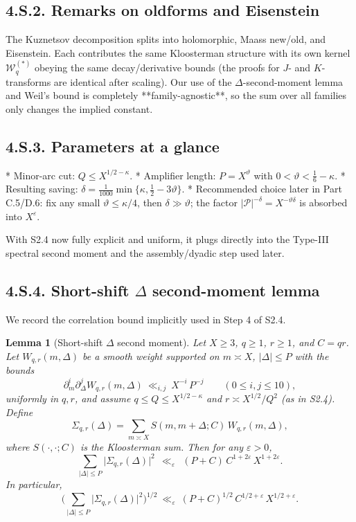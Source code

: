 \documentclass[11pt]{article}
\newtheorem{lemma}{Lemma}[section]
\theoremstyle{definition}
\theoremstyle{remark}
\begin{document}
\subsection*{4.S.2. Remarks on oldforms and Eisenstein}

The Kuznetsov decomposition splits into holomorphic, Maass new/old, and Eisenstein. Each contributes the same Kloosterman structure with its own kernel $\mathcal W_q^{(*)}$ obeying the same decay/derivative bounds (the proofs for $J$- and $K$-transforms are identical after scaling). Our use of the $\Delta$-second-moment lemma and Weil’s bound is completely **family-agnostic**, so the sum over all families only changes the implied constant.

\subsection*{4.S.3. Parameters at a glance}

* Minor-arc cut: $Q\le X^{1/2-\kappa}$.
* Amplifier length: $P=X^\vartheta$ with $0<\vartheta<\tfrac16-\kappa$.
* Resulting saving: $\delta=\frac1{1000}\min\{\kappa,\tfrac12-3\vartheta\}$.
* Recommended choice later in Part C.5/D.6: fix any small $\vartheta\le \kappa/4$, then $\delta\gg\vartheta$; the factor $|\mathcal P|^{-\delta}=X^{-\vartheta\delta}$ is absorbed into $X^\varepsilon$.

With S2.4 now fully explicit and uniform, it plugs directly into the Type-III spectral second moment and the assembly/dyadic step used later.

\subsection*{4.S.4. Short-shift $\Delta$ second-moment lemma}

We record the correlation bound implicitly used in Step 4 of S2.4.

\begin{lemma}[Short-shift $\Delta$ second moment]\label{lem:delta-second-moment}
	Let $X\ge 3$, $q\ge 1$, $r\ge 1$, and $C=qr$. Let $W_{q,r}(m,\Delta)$ be a smooth weight supported on $m\asymp X$, $|\Delta|\le P$ with the bounds
	\[
		\partial_m^{i}\partial_\Delta^{j} W_{q,r}(m,\Delta)\ \ll_{i,j}\ X^{-i}\,P^{-j}
		\qquad (0\le i,j\le 10),
	\]
	uniformly in $q,r$, and assume $q\le Q\le X^{1/2-\kappa}$ and $r\asymp X^{1/2}/Q^2$ (as in S2.4). Define
	\[
		\Sigma_{q,r}(\Delta)=\sum_{m\asymp X} S(m,m+\Delta;C)\,W_{q,r}(m,\Delta),
	\]
	where $S(\cdot,\cdot;C)$ is the Kloosterman sum. Then for any $\varepsilon>0$,
	\[
		\sum_{|\Delta|\le P} \big|\Sigma_{q,r}(\Delta)\big|^2\ \ \ll_{\varepsilon}\ \ (P+C)\,C^{1+2\varepsilon}\,X^{1+2\varepsilon}.
	\]
	In particular,
	\[
		\Big(\sum_{|\Delta|\le P} \big|\Sigma_{q,r}(\Delta)\big|^2\Big)^{1/2}
		\ \ll_{\varepsilon}\ (P+C)^{1/2}\,C^{1/2+\varepsilon}\,X^{1/2+\varepsilon}.
	\]
\end{lemma}
\end{document}
